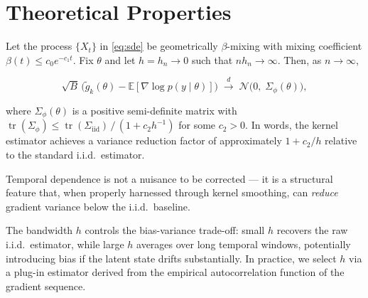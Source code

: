 \section{Theoretical Properties}

\begin{theorembox}[title={Asymptotic Normality of $\tilde{g}_{k}$}]
Let the process $\{X_{t}\}$ in \eqref{eq:sde} be geometrically $\beta$-mixing with mixing coefficient $\beta(t) \le c_{0}e^{-c_{1}t}$. Fix $\theta$ and let $h = h_{n} \to 0$ such that $nh_{n} \to \infty$. Then, as $n \to \infty$,

\begin{equation}\label{eq:clt}
\sqrt{B}\,\bigl(\tilde{g}_{k}(\theta) - \mathbb{E}[\nabla\log p(y\mid\theta)]\bigr) \;\xrightarrow{d}\; \mathcal{N}\!\bigl(0,\; \Sigma_{\phi}(\theta)\bigr),
\end{equation}

\noindent where $\Sigma_{\phi}(\theta)$ is a positive semi-definite matrix with $\operatorname{tr}(\Sigma_{\phi}) \le \operatorname{tr}(\Sigma_{\mathrm{iid}})\,/\,(1 + c_{2}h^{-1})$ for some $c_{2} > 0$. In words, the kernel estimator achieves a variance reduction factor of approximately $1 + c_{2}/h$ relative to the standard i.i.d.\ estimator.
\end{theorembox}

\vspace{6pt}

\begin{center}
\begin{minipage}{0.48\textwidth}
\begin{tcolorbox}[colback=ChicagoMaroon!6,colframe=ChicagoMaroon!50,arc=5pt,boxrule=0.6pt,title={\textbf{Key insight}},fonttitle=\bfseries\color{ChicagoMaroon}]
Temporal dependence is not a nuisance to be corrected --- it is a structural feature that, when properly harnessed through kernel smoothing, can \textit{reduce} gradient variance below the i.i.d.\ baseline.
\end{tcolorbox}
\end{minipage}
\end{center}

\vspace{6pt}

The bandwidth $h$ controls the bias-variance trade-off: small $h$ recovers the raw i.i.d.\ estimator, while large $h$ averages over long temporal windows, potentially introducing bias if the latent state drifts substantially. In practice, we select $h$ via a plug-in estimator derived from the empirical autocorrelation function of the gradient sequence.
